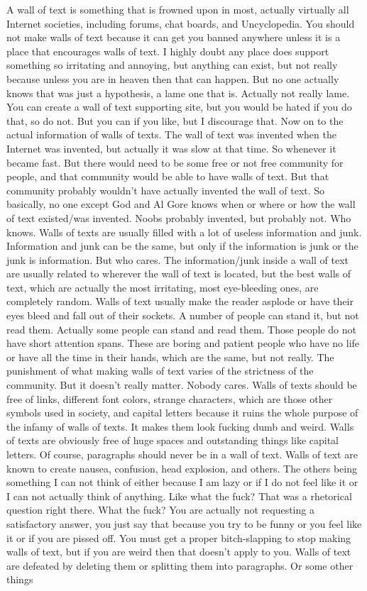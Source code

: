 \documentclass[11pt]{article}
\begin{document}
\begin{center}
\cite{lamport94}
A wall of text is something that is frowned upon in most, actually virtually all Internet societies, including forums, chat boards, and Uncyclopedia. You should not make walls of text because it can get you banned anywhere unless it is a place that encourages walls of text. I highly doubt any place does support something so irritating and annoying, but anything can exist, but not really because unless you are in heaven then that can happen. But no one actually knows that was just a hypothesis, a lame one that is. Actually not really lame. You can create a wall of text supporting site, but you would be hated if you do that, so do not. But you can if you like, but I discourage that. Now on to the actual information of walls of texts. The wall of text was invented when the Internet was invented, but actually it was slow at that time. So whenever it became fast. But there would need to be some free or not free community for people, and that community would be able to have walls of text. But that community probably wouldn't have actually invented the wall of text. So basically, no one except God and Al Gore knows when or where or how the wall of text existed/was invented. Noobs probably invented, but probably not. Who knows. Walls of texts are usually filled with a lot of useless information and junk. Information and junk can be the same, but only if the information is junk or the junk is information. But who cares. The information/junk inside a wall of text are usually related to wherever the wall of text is located, but the best walls of text, which are actually the most irritating, most eye-bleeding ones, are completely random. Walls of text usually make the reader asplode or have their eyes bleed and fall out of their sockets. A number of people can stand it, but not read them. Actually some people can stand and read them. Those people do not have short attention spans. These are boring and patient people who have no life or have all the time in their hands, which are the same, but not really. The punishment of what making walls of text varies of the strictness of the community. But it doesn't really matter. Nobody cares. Walls of texts should be free of links, different font colors, strange characters, which are those other symbols used in society, and capital letters because it ruins the whole purpose of the infamy of walls of texts. It makes them look fucking dumb and weird. Walls of texts are obviously free of huge spaces and outstanding things like capital letters. Of course, paragraphs should never be in a wall of text. Walls of text are known to create nausea, confusion, head explosion, and others. The others being something I can not think of either because I am lazy or if I do not feel like it or I can not actually think of anything. Like what the fuck? That was a rhetorical question right there. What the fuck? You are actually not requesting a satisfactory answer, you just say that because you try to be funny or you feel like it or if you are pissed off. You must get a proper bitch-slapping to stop making walls of text, but if you are weird then that doesn't apply to you. Walls of text are defeated by deleting them or splitting them into paragraphs. Or some other things 
\end{center}
\end{document}
